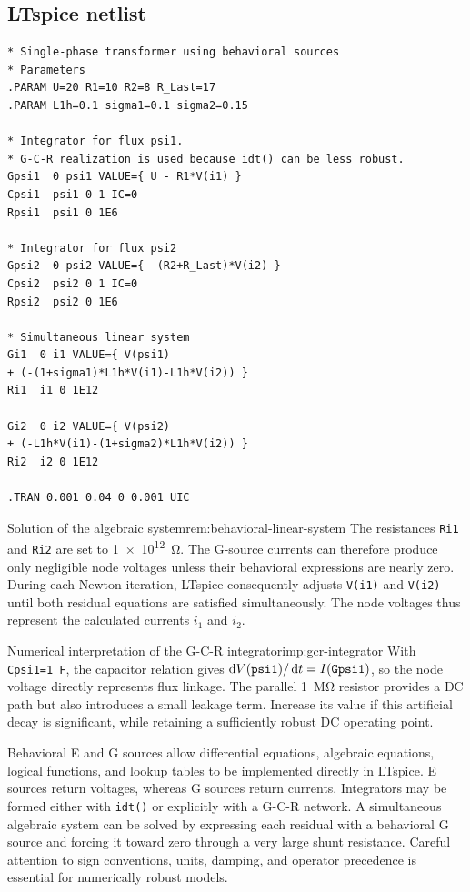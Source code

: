 \subsection{LTspice netlist}

\begin{lstlisting}[style=LTspice,caption={Behavioral implementation of a single-phase transformer.},label={lst:behavioral-transformer}]
* Single-phase transformer using behavioral sources
* Parameters
.PARAM U=20 R1=10 R2=8 R_Last=17
.PARAM L1h=0.1 sigma1=0.1 sigma2=0.15

* Integrator for flux psi1.
* G-C-R realization is used because idt() can be less robust.
Gpsi1  0 psi1 VALUE={ U - R1*V(i1) }
Cpsi1  psi1 0 1 IC=0
Rpsi1  psi1 0 1E6

* Integrator for flux psi2
Gpsi2  0 psi2 VALUE={ -(R2+R_Last)*V(i2) }
Cpsi2  psi2 0 1 IC=0
Rpsi2  psi2 0 1E6

* Simultaneous linear system
Gi1  0 i1 VALUE={ V(psi1)
+ (-(1+sigma1)*L1h*V(i1)-L1h*V(i2)) }
Ri1  i1 0 1E12

Gi2  0 i2 VALUE={ V(psi2)
+ (-L1h*V(i1)-(1+sigma2)*L1h*V(i2)) }
Ri2  i2 0 1E12

.TRAN 0.001 0.04 0 0.001 UIC
\end{lstlisting}

\begin{remark}{Solution of the algebraic system}{rem:behavioral-linear-system}
The resistances \texttt{Ri1} and \texttt{Ri2} are set to
\SI{1e12}{\ohm}. The G-source currents can therefore produce only negligible
node voltages unless their behavioral expressions are nearly zero. During each
Newton iteration, LTspice consequently adjusts \texttt{V(i1)} and
\texttt{V(i2)} until both residual equations are satisfied simultaneously.
The node voltages thus represent the calculated currents $i_1$ and $i_2$.
\end{remark}

\begin{important}{Numerical interpretation of the G-C-R integrator}{imp:gcr-integrator}
With \texttt{Cpsi1=1 F}, the capacitor relation gives
$\mathop{}\!\mathrm{d} V(\texttt{psi1})/\mathop{}\!\mathrm{d} t=I(\texttt{Gpsi1})$, so the node voltage
directly represents flux linkage. The parallel \SI{1}{\mega\ohm} resistor
provides a DC path but also introduces a small leakage term. Increase its value
if this artificial decay is significant, while retaining a sufficiently robust
DC operating point.
\end{important}

\begin{chaptersummary}
Behavioral E and G sources allow differential equations, algebraic equations,
logical functions, and lookup tables to be implemented directly in LTspice.
E sources return voltages, whereas G sources return currents. Integrators may
be formed either with \texttt{idt()} or explicitly with a G-C-R network. A
simultaneous algebraic system can be solved by expressing each residual with a
behavioral G source and forcing it toward zero through a very large shunt
resistance. Careful attention to sign conventions, units, damping, and
operator precedence is essential for numerically robust models.
\end{chaptersummary}
